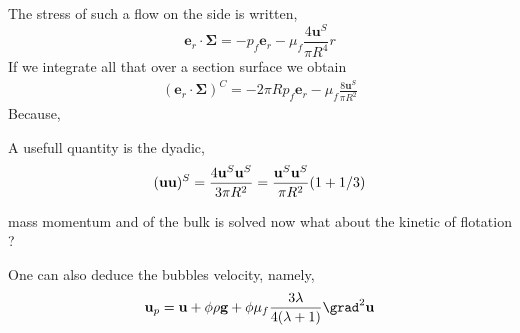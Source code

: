 The stress of such a flow on the side is written,
\begin{equation}
    \textbf{e}_r \cdot \bm\Sigma = - p_f \textbf{e}_r - \mu_f  \frac{4 \textbf{u}^S}{\pi R^4} r
\end{equation}
If we integrate all that over a section surface we obtain
\begin{align}
    (\textbf{e}_r \cdot \bm\Sigma)^C
    =
    -2 \pi R p_f \textbf{e}_r - \mu_f  \frac{8 \textbf{u}^S}{\pi R^2}
\end{align}
Because,


A usefull quantity is the dyadic,
\begin{equation}
    (\textbf{uu})^S 
    = 
    \frac{4 \textbf{u}^S\textbf{u}^S}{3 \pi R^2}
    =  
    \frac{\textbf{u}^S\textbf{u}^S}{\pi R^2}(1+ 1/3)
    \\
\end{equation}

mass momentum and of the bulk is solved now what about the kinetic of flotation ? 

One can also deduce the bubbles velocity, namely,
\begin{align*}
    \textbf{u}_p
    =
    \textbf{u}
    +
    \phi\rho\textbf{g} 
    + \phi\mu_f  \frac{3\lambda}{4(\lambda +1)} \grad^2 \textbf{u}
\end{align*}
